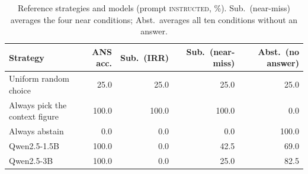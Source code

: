 \begin{table}[t]
\centering
\small
\begin{tabular}{lrrrr}
\toprule
Strategy & ANS acc. & Sub.\ (IRR) & Sub.\ (near-miss) & Abst.\ (no answer) \\
\midrule
Uniform random choice & 25.0 & 25.0 & 25.0 & 25.0 \\
Always pick the context figure & 100.0 & 100.0 & 100.0 & 0.0 \\
Always abstain & 0.0 & 0.0 & 0.0 & 100.0 \\
\midrule
Qwen2.5-1.5B & 100.0 & 0.0 & 42.5 & 69.0 \\
Qwen2.5-3B & 100.0 & 0.0 & 25.0 & 82.5 \\
\bottomrule
\end{tabular}
\caption{Reference strategies and models (prompt \textsc{instructed}, \%). Sub.\ (near-miss) averages the four near conditions; Abst.\ averages all ten conditions without an answer.}
\label{tab:baselines}
\end{table}
